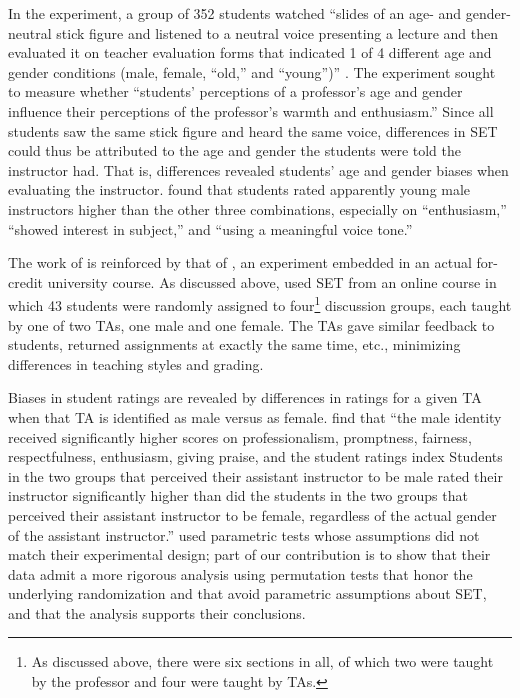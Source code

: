 \documentclass[12pt]{article}
\begin{document}
In the \citet{Arbuckle2003} experiment, a group of 352 students watched 
``slides of an age- and gender-neutral stick figure and listened to a neutral voice presenting a lecture and then evaluated it on teacher evaluation forms that indicated 1 of 4 different age and gender conditions 
(male, female, ``old,'' and ``young'')'' \citealp[p.507]{Arbuckle2003}. 
The experiment sought to measure whether 
``students' perceptions of a professor's age and gender influence their perceptions of the 
professor's warmth and enthusiasm.'' 
Since all students saw the same stick figure and heard the same voice, differences in SET 
could thus be attributed to the age and gender the students were told the instructor had.
That is, differences revealed students' age and gender biases when evaluating the instructor. 
\citet{Arbuckle2003} found that students rated apparently young male instructors higher 
than the other three combinations, especially on ``enthusiasm,'' ``showed interest in subject,'' 
and ``using a meaningful voice tone.'' 

The work of \citet{Arbuckle2003} is reinforced by that of \citet{MacNell2014},
an experiment embedded in an actual for-credit university course. 
As discussed above, \citet{MacNell2014} used SET from an online course in which 
43 students were randomly assigned to four\footnote{%
As discussed above, there were six sections in all, of which two were taught by the professor and four
were taught by TAs.
} 
discussion groups, each taught by one of two TAs, one male and one female. 
The TAs gave similar feedback to students, returned assignments at exactly the same time, etc., 
minimizing differences in teaching styles and grading.

Biases in student ratings are revealed by differences in ratings for a given TA when that 
TA is identified as male versus as female.
\citet{MacNell2014} find that ``the male identity received significantly higher scores on professionalism, promptness, fairness, respectfulness, enthusiasm, giving praise, and the
student ratings index \textellipsis Students in the two groups that perceived their assistant
instructor to be male rated their instructor significantly higher than did the students in the
two groups that perceived their assistant instructor to be female, regardless of the actual gender
of the assistant instructor.'' 
\citet{MacNell2014} used parametric tests whose assumptions did not match their experimental
design; part of our contribution is to show that their data admit a more rigorous analysis
using permutation tests that honor the underlying randomization and that avoid parametric
assumptions about SET, and that the analysis supports their conclusions.
\end{document}

